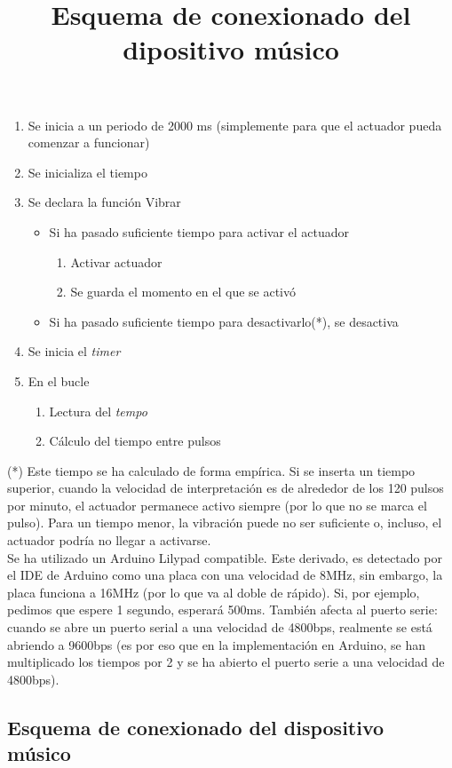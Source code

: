 \begin{enumerate}
  \item Se inicia a un periodo de 2000 ms (simplemente para que el actuador pueda comenzar a
  funcionar)
  \item Se inicializa el tiempo
  \item Se declara la función Vibrar
    \begin{itemize}
      \item Si ha pasado suficiente tiempo para activar el actuador
        \begin{enumerate}
          \item Activar actuador
          \item Se guarda el momento en el que se activó
        \end{enumerate}
      \item Si ha pasado suficiente tiempo para desactivarlo(*), se desactiva
    \end{itemize}
  \item Se inicia el \textit{timer}
  \item En el bucle
    \begin{enumerate}
      \item Lectura del \textit{tempo}
      \item Cálculo del tiempo entre pulsos
    \end{enumerate}
\end{enumerate}

(*) Este tiempo se ha calculado de forma empírica. Si se inserta un tiempo superior,
cuando la velocidad de interpretación es de alrededor de los 120 pulsos por minuto,
el actuador permanece activo siempre (por lo que no se marca el pulso). Para un tiempo
menor, la vibración puede no ser suficiente o, incluso, el actuador podría no llegar a
activarse.\\

Se ha utilizado un Arduino Lilypad compatible. Este derivado, es detectado por el IDE de Arduino
como una placa con una velocidad de 8MHz, sin embargo,
la placa funciona a 16MHz (por lo que va al doble de rápido). Si, por ejemplo, pedimos que espere
1 segundo, esperará 500ms. También afecta al puerto serie: cuando se abre un puerto serial a una velocidad
de 4800bps, realmente se está abriendo a 9600bps (es por eso que en la implementación en Arduino, se han multiplicado
los tiempos por 2 y se ha abierto el puerto serie a una velocidad de 4800bps).\\

\subsection{Esquema de conexionado del dispositivo músico}
\title{Esquema de conexionado del dipositivo músico}

